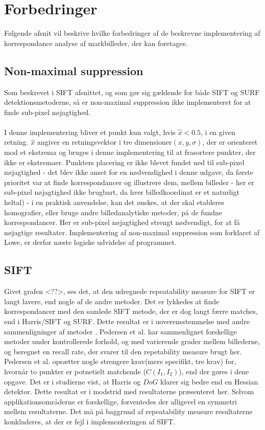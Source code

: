 \section{Forbedringer}
Følgende afsnit vil beskrive hvilke forbedringer af de beskrevne implementering af korrespondance analyse af markbilleder, der kan foretages. 

\subsection{Non-maximal suppression}
Som beskrevet i SIFT afsnittet, og som gør sig gældende for både SIFT og SURF detektionsmetoderne, så er non-maximal suppression ikke implementeret for at finde sub-pixel nøjagtighed. 
\\
\\
I denne implementering bliver et punkt kun valgt, hvis $\hat{x} < 0.5$, i en given retning. $\hat{x}$ angiver en retningsvektor i tre dimensioner$(x, y, \sigma)$, der er orienteret mod et ekstrema og bruges i denne implementering til at frasortere punkter, der ikke er ekstremaer. Punkters placering er ikke blevet fundet ned til sub-pixel nøjagtighed - det blev ikke anset for en nødvendighed i denne udgave, da første prioritet var at finde korrespondancer og illustrere dem, mellem billeder - her er sub-pixel nøjagtighed ikke brugbart, da hver billedkoordinat er et naturligt heltal) - i en praktisk anvendelse, kan det ønskes, at der skal etableres homografier, eller bruge andre billedanalytiske metoder, på de fundne korrespondancer. Her er sub-pixel nøjagtighed strengt nødvendigt, for at få nøjagtige resultater. Implementering af non-maximal suppression som forklaret af Lowe, er derfor næste logiske udvidelse af programmet. 

\subsection{SIFT}
Givet grafen <??>, ses det, at den udregnede repeatability measure for SIFT er langt lavere, end nogle af de andre metoder. Det er lykkedes at finde korrespondancer med den samlede SIFT metode, der er dog langt færre matches, end i Harris/SIFT og SURF. Dette resultat er i uoverensstemmelse med andre sammenligninger af metoder\cite{kim} \cite{kim2}. Pedersen et al. har sammenlignet forskellige metoder under kontrollerede forhold, og med varierende grader mellem billederne, og beregnet en recall rate, der svarer til den repetability measure brugt her. Pedersen et al. opsætter nogle strengere krav(mere specifikt, tre krav) for, hvornår to punkter er potnetielt matchende ($C(I_1, I_2)$), end der gøres i dene opgave. Det er i studierne vist, at Harris og $DoG$ klarer sig bedre end en Hessian detektor. Dette resultat er i modstrid med resultaterne præsenteret her. Selvom applikationsområderne er forskellige, forventedes der alligevel en symmetri mellem resultaterne. Det må på baggrund af repeatability measure resultaterne konkluderes, at der er fejl i implementeringen af SIFT. 


